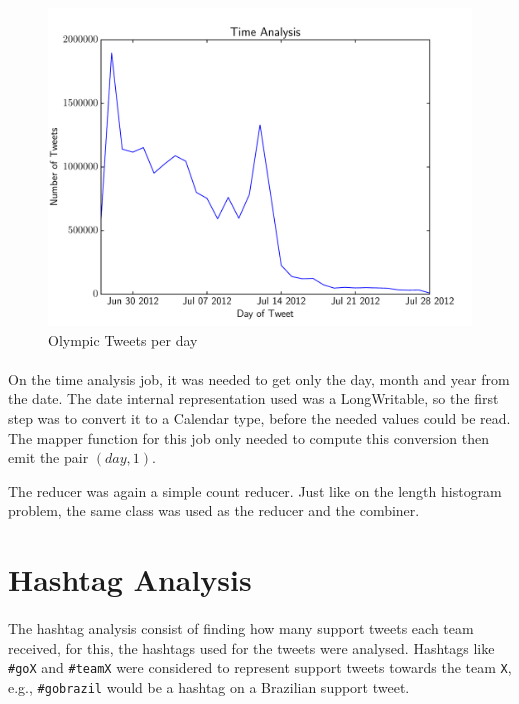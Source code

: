 \documentclass[10pt,a4paper]{article}
\begin{document}
\begin{figure}[!b]
    \centering
    \includegraphics[width=.7\textwidth]{imgs/time-analysis}
    \caption{Olympic Tweets per day}\label{fig::time}
\end{figure}

\paragraph*{}
On the time analysis job, it was needed to get only the day, month and year from
the date. The date internal representation used was a LongWritable, so the first
step was to convert it to a Calendar type, before the needed values could be
read.  The mapper function for this job only needed to compute this conversion
then emit the pair $(day, 1)$.

The reducer was again a simple count reducer. Just like on the length histogram
problem, the same class was used as the reducer and the combiner.


\section{Hashtag Analysis}

\paragraph*{}
The hashtag analysis consist of finding how many support tweets each team
received, for this, the hashtags used for the tweets were analysed. Hashtags
like {\tt \#goX} and {\tt \#teamX} were considered to represent support tweets
towards the team {\tt X}, e.g., {\tt \#gobrazil} would be a hashtag on a
Brazilian support tweet.
\end{document}
